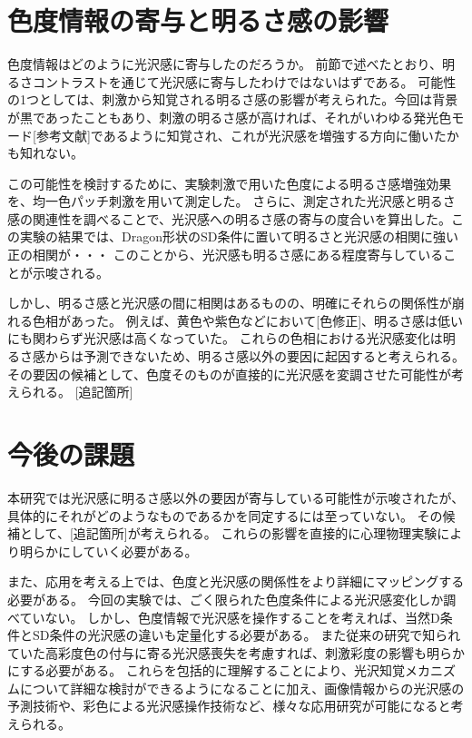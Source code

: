     \section{色度情報の寄与と明るさ感の影響}
        色度情報はどのように光沢感に寄与したのだろうか。
        前節で述べたとおり、明るさコントラストを通じて光沢感に寄与したわけではないはずである。
        可能性の1つとしては、刺激から知覚される明るさ感の影響が考えられた。今回は背景が黒であったこともあり、刺激の明るさ感が高ければ、それがいわゆる発光色モード[参考文献]であるように知覚され、これが光沢感を増強する方向に働いたかも知れない。
        
        この可能性を検討するために、実験刺激で用いた色度による明るさ感増強効果を、均一色パッチ刺激を用いて測定した。
        さらに、測定された光沢感と明るさ感の関連性を調べることで、光沢感への明るさ感の寄与の度合いを算出した。この実験の結果では、Dragon形状のSD条件に置いて明るさと光沢感の相関に強い正の相関が・・・
        このことから、光沢感も明るさ感にある程度寄与していることが示唆される。

        しかし、明るさ感と光沢感の間に相関はあるものの、明確にそれらの関係性が崩れる色相があった。
        例えば、黄色や紫色などにおいて[色修正]、明るさ感は低いにも関わらず光沢感は高くなっていた。
        これらの色相における光沢感変化は明るさ感からは予測できないため、明るさ感以外の要因に起因すると考えられる。
        その要因の候補として、色度そのものが直接的に光沢感を変調させた可能性が考えられる。
        [追記箇所]

    \section{今後の課題}
        本研究では光沢感に明るさ感以外の要因が寄与している可能性が示唆されたが、具体的にそれがどのようなものであるかを同定するには至っていない。
        その候補として、[追記箇所]が考えられる。
        これらの影響を直接的に心理物理実験により明らかにしていく必要がある。

        また、応用を考える上では、色度と光沢感の関係性をより詳細にマッピングする必要がある。
        今回の実験では、ごく限られた色度条件による光沢感変化しか調べていない。
        しかし、色度情報で光沢感を操作することを考えれば、当然D条件とSD条件の光沢感の違いも定量化する必要がある。
        また従来の研究で知られていた高彩度色の付与に寄る光沢感喪失\cite{Nishida}を考慮すれば、刺激彩度の影響も明らかにする必要がある。
        これらを包括的に理解することにより、光沢知覚メカニズムについて詳細な検討ができるようになることに加え、画像情報からの光沢感の予測技術や、彩色による光沢感操作技術など、様々な応用研究が可能になると考えられる。


    \newpage
